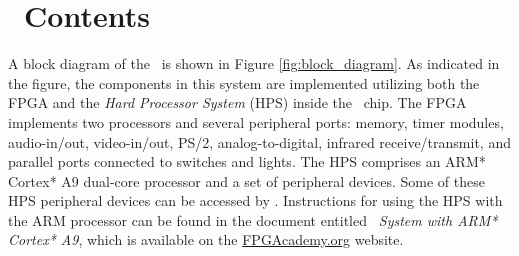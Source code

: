 \section{\systemName~Contents}
A block diagram of the {\it \systemNameFull}~is shown in 
Figure \ref{fig:block_diagram}.  As indicated in the figure, the components in this system 
are implemented utilizing both the FPGA and the {\it Hard Processor System} (HPS) inside 
the \FPGADeviceFamily~chip. 
The FPGA implements two \processor\textsuperscript{\textregistered} processors and 
several peripheral ports: memory, timer modules, audio-in/out, video-in/out, PS/2, 
analog-to-digital, infrared receive/transmit, and parallel ports connected to switches and 
lights.  The HPS comprises an ARM* Cortex* A9 dual-core processor and a set of peripheral 
devices.  Some of these HPS peripheral devices can be accessed by \processor. 
Instructions for using the HPS with the ARM processor can be found 
in the document entitled {\it \systemName~System with ARM* Cortex* A9},
which is available on the 
\href{https://www.fpgacademy.org/tutorials.html} {FPGAcademy.org} website.

